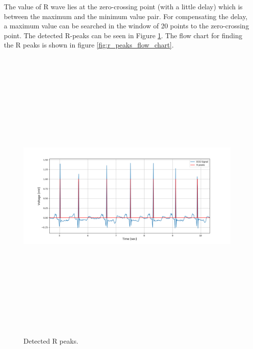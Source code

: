 The value of R wave lies at the zero-crossing point (with a little delay) which is between the maximum and the minimum value pair. For compensating the delay, a maximum value can be searched in the window of 20 points to the zero-crossing point. The detected R-peaks can be seen in Figure \ref{fig:r_peaks}. The flow chart for finding the R peaks is shown in figure \ref{fig:r_peaks_flow_chart}.

\begin{figure}[htpb]
	\centering
	\includegraphics[width=15cm,height=15cm,keepaspectratio=true]{images/r_peaks}
	\caption{
		Detected R peaks.
	}
	\label{fig:r_peaks}
\end{figure}


